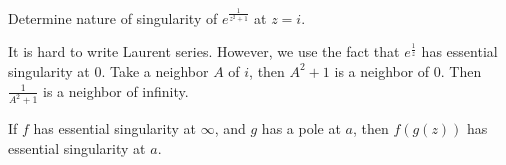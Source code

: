 \begin{example}
	Determine nature of singularity of $e^{\frac{1}{z^2 + 1}}$ at $z = i$.
	
	It is hard to write Laurent series. However, we use the fact that $e ^{\frac{1}{z}}$ has essential singularity at $0$. Take a neighbor $A$ of $i$, then $A^2 + 1$ is a neighbor of $0$. Then $\frac{1}{A^2 + 1}$ is a neighbor of infinity.
\end{example}

\begin{theorem}
	If $f$ has essential singularity at $\infty $, and $g$ has a pole at $a$, then $f(g(z))$ has essential singularity at $a$.
\end{theorem}
